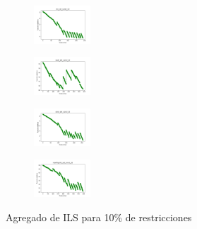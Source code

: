 \begin{figure}[H]
\begin{subfigure}
        \centering
        \includegraphics[width=0.234\textwidth]{img/ils/iris_set_const_10_3773969821_cost.png}
    \end{subfigure}
    \hfill
    \begin{subfigure}
        \centering
        \includegraphics[width=0.234\textwidth]{img/ils/ecoli_set_const_10_3773969821_cost.png}
    \end{subfigure}
    \hfill
    \begin{subfigure}
        \centering
        \includegraphics[width=0.234\textwidth]{img/ils/rand_set_const_10_3773969821_cost.png}
    \end{subfigure}
    \hfill
    \begin{subfigure}
        \centering
        \includegraphics[width=0.234\textwidth]{img/ils/newthyroid_set_const_10_3773969821_cost.png}
    \end{subfigure}
    \caption{Agregado de ILS para 10\% de restricciones}
\end{figure}


\vspace*{\fill}
\newpage
\vspace*{\fill}

